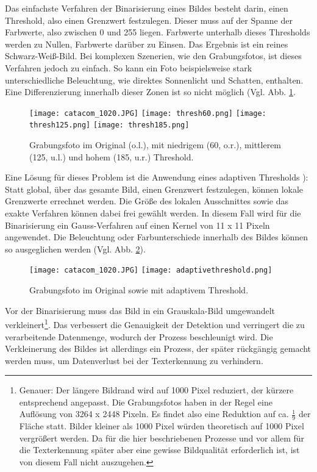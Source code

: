 Das einfachste Verfahren der Binarisierung eines Bildes besteht darin, einen Threshold, also einen Grenzwert festzulegen. Dieser muss auf der Spanne der Farbwerte, also zwischen 0 und 255 liegen.  Farbwerte unterhalb dieses Thresholds werden zu Nullen, Farbwerte darüber zu Einsen. Das Ergebnis ist ein reines Schwarz-Weiß-Bild. Bei komplexen Szenerien, wie den Grabungsfotos, ist dieses Verfahren jedoch zu einfach. So kann ein Foto beispielsweise stark unterschiedliche Beleuchtung, wie direktes Sonnenlicht und Schatten, enthalten. Eine Differenzierung innerhalb dieser Zonen ist so nicht möglich (Vgl. Abb. \ref{fig:threshold}.\\
\begin{figure}[h!]
\texttt{[image: catacom\_1020.JPG]}
\texttt{[image: thresh60.png]}
\texttt{[image: thresh125.png]}
\texttt{[image: thresh185.png]}
\caption{Grabungsfoto im Original (o.l.), mit niedrigem (60, o.r.), mittlerem (125, u.l.) und hohem (185, u.r.) Threshold.}
\label{fig:threshold}
\end{figure}
Eine Lösung für dieses Problem ist die Anwendung eines adaptiven Thresholds \cite{opencvadaptivethresholdopencvadaptivethreshold}): Statt global, über das gesamte Bild, einen Grenzwert festzulegen, können lokale Grenzwerte errechnet werden. Die Größe des lokalen Ausschnittes sowie das exakte Verfahren können dabei frei gewählt werden. In diesem Fall wird für die Binarisierung ein Gauss-Verfahren auf einen Kernel von 11 x 11 Pixeln angewendet. Die Beleuchtung oder Farbunterschiede innerhalb des Bildes können so ausgeglichen werden (Vgl. Abb. \ref{fig:adaptivethreshold}).
\begin{figure}[h!]
\texttt{[image: catacom\_1020.JPG]}
\texttt{[image: adaptivethreshold.png]}
\caption{Grabungsfoto im Original sowie mit adaptivem Threshold.}
\label{fig:adaptivethreshold}
\end{figure}
Vor der Binarisierung muss das Bild in ein Grauskala-Bild umgewandelt verkleinert\footnote{Genauer: Der längere Bildrand wird auf 1000 Pixel reduziert, der kürzere entsprechend angepasst. Die Grabungsfotos haben in der Regel eine Auflösung von 3264 x 2448 Pixeln. Es findet also eine Reduktion auf ca. $\frac{1}{9}$ der Fläche statt. Bilder kleiner als 1000 Pixel würden theoretisch auf 1000 Pixel vergrößert werden. Da für die hier beschriebenen Prozesse und vor allem für die Texterkennung später aber eine gewisse Bildqualität erforderlich ist, ist von diesem Fall nicht auszugehen.}. Das verbessert die Genauigkeit der Detektion und verringert die zu verarbeitende Datenmenge, wodurch der Prozess beschleunigt wird. Die Verkleinerung des Bildes ist allerdings ein Prozess, der später rückgängig gemacht werden muss, um Datenverlust bei der Texterkennung zu verhindern.

